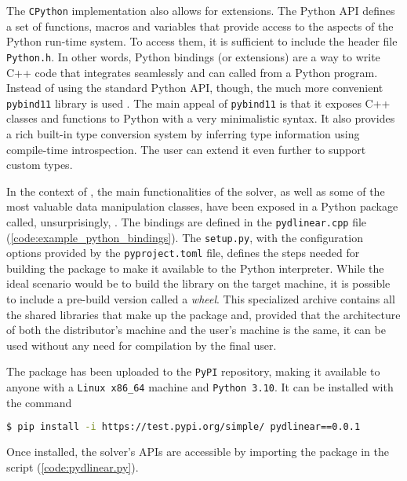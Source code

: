 The \texttt{CPython} implementation also allows for extensions.
The Python API defines a set of functions, macros and variables that provide access to the aspects of the Python run-time system.
To access them, it is sufficient to include the header file \texttt{Python.h}.
In other words, Python bindings (or extensions) are a way to write C++ code that integrates seamlessly and can called from a Python program.
Instead of using the standard Python API, though, the much more convenient \texttt{pybind11} library is used \cite{man:pybind11}.
The main appeal of \texttt{pybind11} is that it exposes C++ classes and functions to Python with a very minimalistic syntax.
It also provides a rich built-in type conversion system by inferring type information using compile-time introspection.
The user can extend it even further to support custom types.

In the context of \dlinear, the main functionalities of the solver, as well as some of the most valuable data manipulation classes, have been exposed in a Python package called, unsurprisingly, \pydlinear.
The bindings are defined in the \texttt{pydlinear.cpp} file (\autoref{code:example_python_bindings}).
The \texttt{setup.py}, with the configuration options provided by the \texttt{pyproject.toml} file, defines the steps needed for building the package to make it available to the Python interpreter.
While the ideal scenario would be to build the \dlinear library on the target machine, it is possible to include a pre-build version called a \textit{wheel}.
This specialized archive contains all the shared libraries that make up the package and, provided that the architecture of both the distributor's machine and the user's machine is the same, it can be used without any need for compilation by the final user.



The package has been uploaded to the \texttt{PyPI} repository, making it available to anyone with a \texttt{Linux x86\_64} machine and \texttt{Python 3.10}.
It can be installed with the command

\begin{lstlisting}[language=bash,frame=single,showstringspaces=false]
$ pip install -i https://test.pypi.org/simple/ pydlinear==0.0.1
\end{lstlisting}
Once installed, the solver's APIs are accessible by importing the \pydlinear package in the script (\autoref{code:pydlinear.py}). \\ \\ \\ \\

